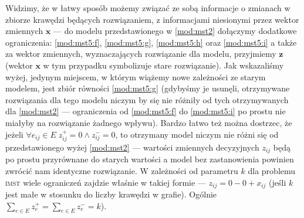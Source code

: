 Widzimy, że w łatwy sposób możemy związać ze sobą informacje o zmianach w zbiorze krawędzi będących rozwiązaniem, z informacjami niesionymi przez wektor zmiennych $\textbf{x}$ --- do modelu przedstawionego w \ref{mod:mst2} dołączymy dodatkowe ograniczenia: \ref{mod:mst5:f}, \ref{mod:mst5:g}, \ref{mod:mst5:h} oraz \ref{mod:mst5:i} a także za wektor zmiennych, wyznaczających rozwiązanie dla modelu, przyjmiemy $\textbf{z}$ (wektor $\textbf{x}$ w tym przypadku symbolizuje stare rozwiązanie). Jak wskazaliśmy wyżej, jedynym miejscem, w którym wiążemy nowe zależności ze starym modelem, jest zbiór równości \ref{mod:mst5:g} (gdybyśmy je usunęli, otrzymywane rozwiązania dla tego modelu niczym by się nie różniły od tych otrzymywanych dla \ref{mod:mst2} --- ograniczenia od \ref{mod:mst5:f} do \ref{mod:mst5:i} po prostu nie miałyby na rozwiązanie żadnego wpływu). Bardzo łatwo też można dostrzec, że jeżeli $\forall e_{ij} \in E \; z_{ij}^{+} = 0 \wedge z_{ij}^{-} = 0$, to otrzymany model niczym nie różni się od przedstawionego wyżej \ref{mod:mst2} --- wartości zmiennych decyzyjnych $z_{ij}$ będą po prostu przyrównane do starych wartości a model bez zastanowienia powinien zwrócić nam identyczne rozwiązanie. W zależności od parametru $k$ dla problemu \textsc{imst} wiele ograniczeń zajdzie właśnie w takiej formie --- $z_{ij} = 0 - 0 + x_{ij}$ (jeśli $k$ jest małe w stosunku do liczby krawędzi w grafie). Ogólnie $\sum_{e \in E} z_{e}^{+} = \sum_{e \in E} z_{e}^{-} = k$).

